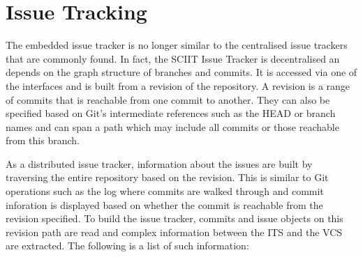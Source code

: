 \documentclass{mproj}
\begin{document}




\section{Issue Tracking}

The embedded issue tracker is no longer similar to the centralised issue trackers that are commonly found. In fact, the SCIIT Issue Tracker is decentralised an depends on the graph structure of branches and commits. It is accessed via one of the interfaces and is built from a revision of the repository. A revision is a range of commits that is reachable from one commit to another. They can also be specified based on Git's intermediate references such as the HEAD or branch names and can span a path which may include all commits or those reachable from this branch.

As a distributed issue tracker, information about the issues are built by traversing the entire repository based on the revision. This is similar to Git operations such as the log where commits are walked through and commit inforation is displayed based on whether the commit is reachable from the revision specified. To build the issue tracker, commits and issue objects on this revision path are read and complex information between the ITS and the VCS are extracted. The following is a list of such information:
\end{document}
